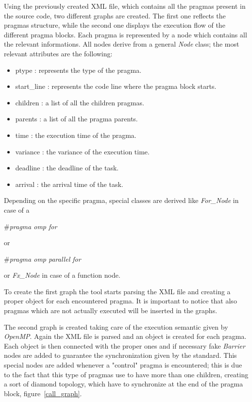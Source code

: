 \documentclass[a4paper,11pt,oneside]{book}
\begin{document}
Using the previously created XML file, which contains all the pragmas present in the source code, two different graphs are created. The first one reflects the pragmas structure, while the second one displays the execution flow of the different pragma blocks. Each pragma is represented by a node which contains all the relevant informations. All nodes derive from a general \emph{Node} class; the most relevant attributes are the following:
\begin{itemize}
\item{ptype : represents the type of the pragma.}
\item{start\_line : represents the code line where the pragma block starts.}
\item{children : a list of all the children pragmas.}
\item{parents : a list of all the pragma parents.}
\item{time : the execution time of the pragma.}
\item{variance : the variance of the execution time.}
\item{deadline : the deadline of the task.}
\item{arrival : the arrival time of the task.}
\end{itemize}

Depending on the specific pragma, special classes are derived like \emph{For\_Node} in case of a \begin{bf}\emph{$\#$pragma omp for}\end{bf} or \begin{bf}\emph{$\#$pragma omp parallel for}\end{bf} or \emph{Fx\_Node} in case of a function node.

To create the first graph the tool starts parsing the XML file and creating a proper object for each encountered pragma. It is important to notice that also pragmas which are not actually executed will be inserted in the graphs. 

The second graph is created taking care of the execution semantic given by \emph{OpenMP}. Again the XML file is parsed and an object is created for each pragma. Each object is then connected with the proper ones and if necessary fake \emph{Barrier} nodes are added to guarantee the synchronization given by the standard. This special nodes are added whenever a "control" pragma is encountered; this is due to the fact that this type of pragmas use to have more than one children, creating a sort of diamond topology, which have to synchronize at the end of the pragma block, figure~\ref{call_graph}.
\end{document}
